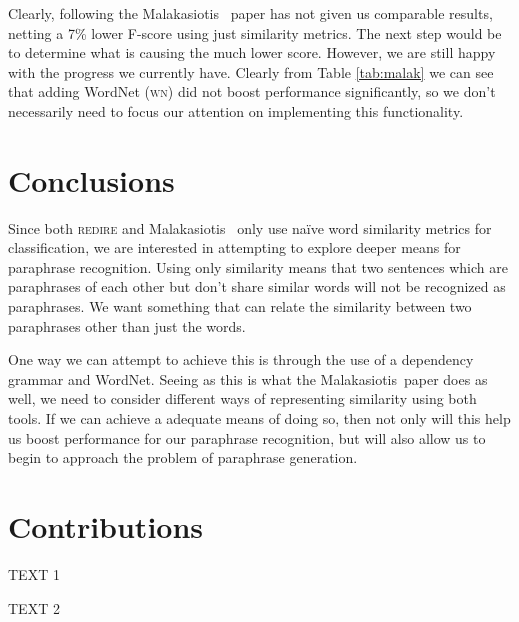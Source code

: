 \documentclass[11pt, reqno]{amsart}
\newcommand{\mala}{Malakasiotis}
\begin{document}
	Clearly, following the \mala~ paper has not given us comparable results, netting a 7\% lower F-score using just similarity metrics. The next step would be to determine what is causing the much lower score. However, we are still happy with the progress we currently have. Clearly from Table \ref{tab:malak} we can see that adding WordNet (\textsc{wn}) did not boost performance significantly, so we don't necessarily need to focus our attention on implementing this functionality.
	\section{Conclusions}
		
	Since both \textsc{redire} and \mala~ only use na\"ive word similarity metrics for classification, we are interested in attempting to explore deeper means for paraphrase recognition. Using only similarity means that two sentences which are paraphrases of each other but don't share similar words will not be recognized as paraphrases. We want something that can relate the similarity between two paraphrases other than just the words. 
	
	One way we can attempt to achieve this is through the use of a dependency grammar and WordNet. Seeing as this is what the \mala~paper does as well, we need to consider different ways of representing similarity using both tools. If we can achieve a adequate means of doing so, then not only will this help us boost performance for our paraphrase recognition, but will also allow us to begin to approach the problem of paraphrase generation.
	
	
	\section{Contributions}
	
	\begin{minipage}{.5\textwidth}
	  TEXT 1
	\end{minipage}%
	\begin{minipage}{.5\textwidth}
	  TEXT 2
	\end{minipage}
	
	
	
		
\end{document}
